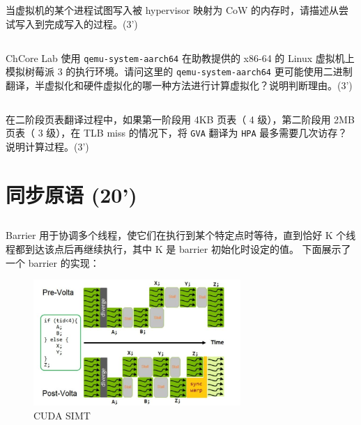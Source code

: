 \documentclass[a4paper,12pt]{article}
\newcommand{\score}[1]{(#1')}
\begin{document}
当虚拟机的某个进程试图写入被 hypervisor 映射为 CoW 的内存时，请描述从尝试写入到完成写入的过程。\score{3}

\subsection{}

ChCore Lab 使用 \verb|qemu-system-aarch64| 在助教提供的 x86-64 的 Linux 虚拟机上模拟树莓派 3 的执行环境。请问这里的 \verb|qemu-system-aarch64| 更可能使用二进制翻译，半虚拟化和硬件虚拟化的哪一种方法进行计算虚拟化？说明判断理由。\score{3}

\subsection{}

在二阶段页表翻译过程中，如果第一阶段用 4KB 页表（ 4 级），第二阶段用 2MB 页表（ 3 级），在 TLB miss 的情况下，将 \verb|GVA| 翻译为 \verb|HPA| 最多需要几次访存？说明计算过程。\score{3}


\section{同步原语 \score{20}}

\subsection{}

Barrier 用于协调多个线程，使它们在执行到某个特定点时等待，直到恰好 K 个线程都到达该点后再继续执行，其中 K 是 barrier 初始化时设定的值。
下面展示了一个 barrier 的实现：

\begin{figure}[!htb]
  \centering
  \includegraphics[width=0.7\textwidth]{img/simt.png}
  \caption{CUDA SIMT}
\end{figure}
\end{document}
